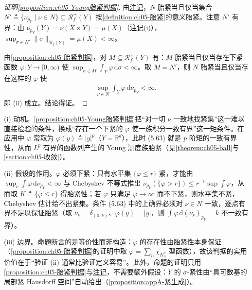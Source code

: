 \documentclass[../../main.tex]{subfiles}%
\begin{document}
\begin{proof}[证明\cref{proposition:ch05-Young胎紧判据}]
由\hyperref[remark:ch05-Young胎紧投影]{注记}，$N$ 胎紧当且仅当集合 $N'\triangleq\{\nu_{p_Y}\mid\nu\in N\}\subseteq\mathscr{R}^+_f(Y)$ 按\cref{definition:ch05-胎紧}的意义胎紧。注意 $N'$ 有界：由 $\nu_{p_Y}(Y)=\nu(X\times Y)=\mu(X)$（\hyperref[remark:ch02-Young投影]{注记}(i)），$\sup_{\sigma\in N'}\|\sigma\|_{\mathscr{R}_f(Y)}=\mu(X)<\infty$。

由\cref{proposition:ch05-胎紧判据}，对 $M\subseteq\mathscr{R}^+_f(Y)$ 有：$M$ 胎紧当且仅当存在下紧函数 $\varphi:Y\to[0,\infty)$ 使 $\sup_{\sigma\in M}\int_Y\varphi\,\mathrm{d}\sigma<\infty$。取 $M=N'$，则 $N$ 胎紧当且仅当存在这样的 $\varphi$ 使
\begin{align*}
\sup_{\nu\in N}\int_Y\varphi\,\mathrm{d}\nu_{p_Y}<\infty,
\end{align*}
即 (ii) 成立。结论得证。
\end{proof}

\begin{remark}\label{remark:ch05-Young胎紧判据动机}
(i) 动机。\cref{proposition:ch05-Young胎紧判据}把“对一切 $\nu$ 一致地找紧集”这一难以直接检验的条件，换成“存在一个下紧的 $\varphi$ 使一族积分一致有界”这一矩条件。在应用中 $\varphi$ 常取为 $\varphi(y)\triangleq|y|^p$（$Y=\mathbb{R}^d$），此时 (5.63) 就是 $p$ 阶矩的一致有界性，从而 $L^p$ 有界的函数列产生的 Young 测度族胎紧（见\cref{theorem:ch05-ball}与\cref{section:ch05-收敛}）。

(ii) 假设的作用。$\varphi$ 必须下紧：只有水平集 $\{\varphi\leqslant r\}$ 紧，才能由 $\sup_\nu\int\varphi\,\mathrm{d}\nu_{p_Y}<\infty$ 与 Chebyshev 不等式推出 $\nu_{p_Y}(\{\varphi>r\})\leqslant r^{-1}\sup\int\varphi$，从而取 $K\triangleq\{\varphi\leqslant r\}$ 得胎紧性；若 $\varphi$ 只满足 $\varphi\to\infty$ 而不下紧，则水平集不紧，Chebyshev 估计给不出紧集。条件 (5.63) 中的上确界必须对 $\nu\in N$ 一致，逐点有界不足以保证胎紧（取 $\nu_k=\delta_{(0,k)}$、$\varphi(y)=|y|$，则 $\int\varphi\,\mathrm{d}(\nu_k)_{p_Y}=k$ 不一致有界）。

(iii) 边界。命题断言的是等价性而非构造：$\varphi$ 的存在性由胎紧性本身保证（\cref{proposition:ch05-胎紧判据}的证明中取 $\varphi=\sum_n\chi_{K_n^c}$ 型函数），故该判据的实用价值在于“验证 (ii) 通常比验证定义容易”。此外，命题的证明只用\cref{proposition:ch05-胎紧判据}与\hyperref[remark:ch05-Young胎紧投影]{注记}，不需要额外假设：$Y$ 的 $\sigma$-紧性由“具可数基的局部紧 Hausdorff 空间”自动给出（\cref{proposition:appA-紧生成}）。
\end{remark}
\end{document}
